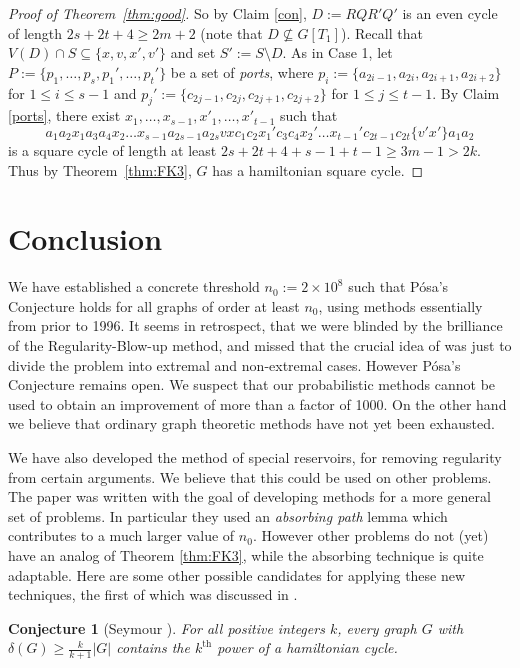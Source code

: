 \documentclass[oneside,12pt]{memoir}
\newtheorem{conjecture}[theorem]{Conjecture}
\newcommand{\n}{2\times 10^8}
\begin{document}
\begin{proof}[Proof of Theorem~\ref{thm:good}]
So by Claim \ref{con}, $D:=RQR'Q'$ is an even cycle of length $2s+2t+4\geq 2m+2$ (note that $D\not\subseteq G[T_1]$). Recall that $V(D)\cap S\subseteq\{x,v,x',v'\}$ and set $S':=S\setminus D$. As in Case 1, let $P:=\{p_{1},\dots,p_{s}, p_1',\dots, p_t'\}$
be a set of \emph{ports}, where $p_{i}:=\{a_{2i-1},a_{2i},a_{2i+1},a_{2i+2}\}$ for $1\leq i\leq s-1$ and $p_j':=\{c_{2j-1},c_{2j},c_{2j+1},c_{2j+2}\}$ for $1\leq j\leq t-1$. 
  By Claim \ref{ports}, 
  there exist $x_1,\dots,x_{s-1},x'_1,\dots,x'_{t-1}$ such that
    $$a_{1}a_{2}x_{1}a_{3}a_{4}x_{2}\dots x_{s-1} a_{2s-1}a_{2s}vxc_{1}c_{2}x_1'c_3c_4x_2'\dots x_{t-1}'c_{2t-1}c_{2t}\{v'x'\}a_1a_2$$ is a square cycle of length at least $2s+2t+4+s-1+t-1\geq 3m-1>2k$. Thus by Theorem~\ref{thm:FK3}, $G$ has a hamiltonian square
cycle.

\end{proof}


\section{Conclusion}
We have established a concrete threshold $n_0:=\n$ such that P\'osa's Conjecture holds for all graphs of order at least  $n_0$, using methods essentially from prior to 1996. It seems in retrospect, that we were blinded by the brilliance of the Regularity-Blow-up method, and missed that the crucial idea of \cite{KSSp} was just to divide the problem into extremal and non-extremal cases.  However P\'osa's Conjecture remains open. We suspect that our probabilistic methods cannot be used to obtain an improvement of more than a factor of 1000. On the other hand we believe that ordinary graph theoretic methods have not yet been exhausted.

We have also developed the method of special reservoirs, for removing regularity from certain arguments.  We believe that this could be used on other problems.
The paper \cite{LSS} was written with the goal of developing methods for a more general set of problems. 
In particular they used an
\emph{absorbing path} lemma which contributes to a much larger value of
$n_0$. However other problems do not (yet) have an analog of Theorem \ref{thm:FK3}, while the absorbing technique is quite adaptable. %
Here are some other possible candidates
for applying these new techniques, the first of which was discussed in
\cite{LSS}.

\begin{conjecture}[Seymour \cite{Sey}]
For all positive integers $k$, every graph $G$ with  $\delta(G)\ge \frac{k}{k+1}|G|$ contains the $k^\text{th}$ power of a hamiltonian cycle.
\end{conjecture}
\end{document}
